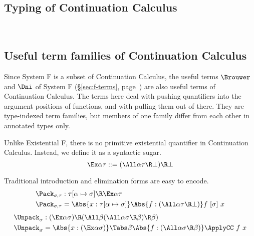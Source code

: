 \documentclass{amsart}
\begin{document}
\subsection{Typing of Continuation Calculus}
~

\nc{}

\nc{}

\nc{}

\nc{}

\FRules

\DoubleNegationElimination

\ExistentialElimination

\subsection{Useful term families of Continuation Calculus}

Since System F is a subset of Continuation Calculus, the useful
terms $\Brouwer$ and $\Dni$ of System F (\S\ref{sec:f-terms},
page~\pageref{sec:f-terms}) are also useful terms of Continuation
Calculus. The terms here deal with pushing quantifiers into the
argument positions of functions, and with pulling them out of
there. They are type-indexed term families, but members of one
family differ from each other in annotated types only.

Unlike Existential F, there is no primitive existential
quantifier in Continuation Calculus. Instead, we define it as a
syntactic sugar.
\[
\Ex\alpha \tau ::= (\All\alpha \tau \R \bot) \R \bot
\]

Traditional introduction and elimination forms are easy to
encode.
\begin{align*}
\Pack_{\sigma,\tau} & :
  \tau[\alpha\mapsto\sigma] \R \Ex\alpha\tau
  \\
\Pack_{\sigma,\tau} & =
  \Abs{x : \tau[\alpha\mapsto\sigma]}
  \Abs{f : (\All\alpha \tau \R \bot)}
  f~[\sigma]~x
\end{align*}
%
\begin{align*}
\Unpack_{\sigma} & :
  (\Ex\alpha\sigma) \R
  (\All\beta (\All\alpha \sigma \R \beta) \R \beta)
  \\
\Unpack_{\sigma} & =
  \Abs{x : (\Ex\alpha\sigma)}
  \Tabs\beta
  \Abs{f : (\All\alpha \sigma \R \beta)}
  \ApplyCC~f~x
\end{align*}
\end{document}
